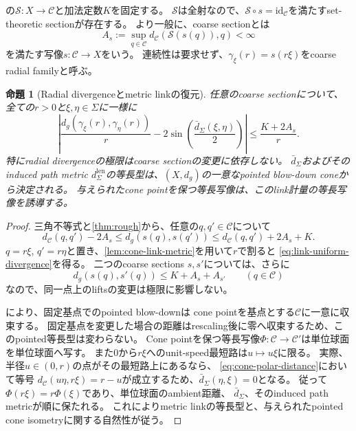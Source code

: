 \documentclass[11pt,a4paper]{ltjsarticle}
\newcommand{\cC}{\mathcal C}
\newcommand{\cS}{\mathcal S}
\theoremstyle{plain}
\newtheorem{proposition}[proposition]{命題}
\theoremstyle{definition}
\theoremstyle{remark}
\begin{document}
の$\cS:X\to\cC$と加法定数$K$を固定する。
$\cS$は全射なので、$\cS\circ s=\mathrm{id}_\cC$を満たすset-theoretic sectionが存在する。
より一般に、coarse sectionとは
\[
 A_s:=\sup_{q\in\cC}d_\cC(\cS(s(q)),q)<\infty
\]
を満たす写像$s:\cC\to X$をいう。
連続性は要求せず、$\gamma_\xi(r)=s(r\xi)$をcoarse radial familyと呼ぶ。

\begin{proposition}[Radial divergenceとmetric linkの復元]
\label{prop:link}
任意のcoarse sectionについて、全ての$r>0$と$\xi,\eta\in\Sigma$に一様に
\begin{equation}
\label{eq:link-uniform-divergence}
 \left|
 \frac{d_g(\gamma_\xi(r),\gamma_\eta(r))}{r}
 -2\sin\!\left(\frac{\bar d_\Sigma(\xi,\eta)}2\right)
 \right|
 \le\frac{K+2A_s}{r}.
\end{equation}
特にradial divergenceの極限はcoarse sectionの変更に依存しない。
$\bar d_\Sigma$およびそのinduced path metric
$d_\Sigma^{\mathrm{len}}$の等長型は、$(X,d_g)$の一意なpointed blow-down coneから決定される。
与えられたcone pointを保つ等長写像は、このlink計量の等長写像を誘導する。
\end{proposition}
\begin{proof}
三角不等式と\cref{thm:rough}から、任意の$q,q'\in\cC$について
\[
 d_\cC(q,q')-2A_s
 \le d_g(s(q),s(q'))
 \le d_\cC(q,q')+2A_s+K.
\]
$q=r\xi$, $q'=r\eta$と置き、\cref{lem:cone-link-metric}を用いて$r$で割ると
\eqref{eq:link-uniform-divergence}を得る。
二つのcoarse sections $s,s'$については、さらに
\[
 d_g(s(q),s'(q))\le K+A_s+A_{s'}
 \qquad(q\in\cC)
\]
なので、同一点上のliftsの変更は極限に影響しない。

により、固定基点でのpointed blow-downは
cone pointを基点とする$\cC$に一意に収束する。
固定基点を変更した場合の距離はrescaling後に零へ収束するため、このpointed等長型は変わらない。
Cone pointを保つ等長写像$\Phi:\cC\to\cC'$は単位球面を単位球面へ写す。
また$0$から$r\xi$へのunit-speed最短路は$u\mapsto u\xi$に限る。
実際、半径$u\in(0,r)$の点がその最短路上にあるなら、
\eqref{eq:cone-polar-distance}において等号
$d_\cC(u\eta,r\xi)=r-u$が成立するため、$\bar d_\Sigma(\eta,\xi)=0$となる。
従って$\Phi(r\xi)=r\Phi(\xi)$であり、単位球面のambient距離、
$\bar d_\Sigma$、そのinduced path metricが順に保たれる。
これによりmetric linkの等長型と、与えられたpointed cone isometryに関する自然性が従う。
\end{proof}
\end{document}
